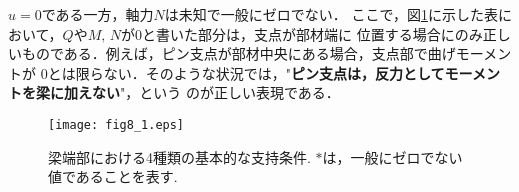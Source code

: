 \documentclass[10pt,a4j]{jbook}
\begin{document}
$u=0$である一方，軸力$N$は未知で一般にゼロでない．
ここで，図\ref{fig:fig8_1}に示した表において，$Q$や$M,\,N$が0と書いた部分は，支点が部材端に
位置する場合にのみ正しいものである．例えば，ピン支点が部材中央にある場合，支点部で曲げモーメントが
0とは限らない．そのような状況では，"{\bf ピン支点は，反力としてモーメントを梁に加えない}"，という
のが正しい表現である．
\begin{figure}
	\begin{center}
	\texttt{[image: fig8\_1.eps]} 
	\end{center}
	\caption{梁端部における4種類の基本的な支持条件. $*$は，一般にゼロでない値であることを表す.}
	\label{fig:fig8_1}
\end{figure}
\end{document}
